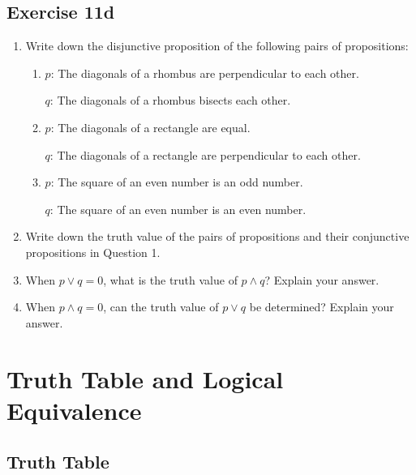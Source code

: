 \documentclass{report}
\begin{document}
\subsection*{Exercise 11d}
\begin{enumerate}[leftmargin=*]
    \item Write down the disjunctive proposition of the following pairs of propositions:
          \begin{enumerate}[label=(\alph*), leftmargin=*]
              \item $p$: The diagonals of a rhombus are perpendicular to each other.

                    $q$: The diagonals of a rhombus bisects each other.

              \item $p$: The diagonals of a rectangle are equal.

                    $q$: The diagonals of a rectangle are perpendicular to each other.

              \item $p$: The square of an even number is an odd number.

                    $q$: The square of an even number is an even number.
          \end{enumerate}

    \item Write down the truth value of the pairs of propositions and their conjunctive
          propositions in Question 1.

    \item When $p \lor q = 0$, what is the truth value of $p \land q$? Explain your
          answer.

    \item When $p \land q = 0$, can the truth value of $p \lor q$ be determined? Explain
          your answer.
\end{enumerate}

\section{Truth Table and Logical Equivalence}

\subsection*{Truth Table}
\end{document}
